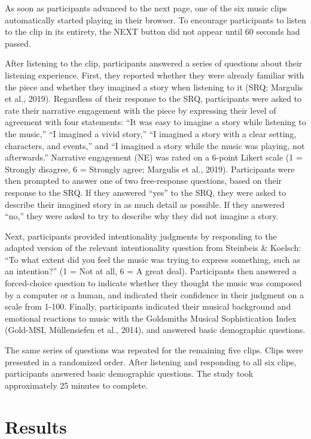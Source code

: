 \documentclass[12pt,twoside]{reedthesis}
\begin{document}
As soon as participants advanced to the next page, one of the six music clips automatically started playing in their browser. To encourage participants to listen to the clip in its entirety, the NEXT button did not appear until 60 seconds had passed. 

After listening to the clip, participants answered a series of questions about their listening experience. First, they reported whether they were already familiar with the piece and whether they imagined a story when listening to it (SRQ; Margulis et al., 2019). Regardless of their response to the SRQ, participants were asked to rate their narrative engagement with the piece by expressing their level of agreement with four statements: “It was easy to imagine a story while listening to the music,” “I imagined a vivid story,” “I imagined a story with a clear setting, characters, and events,” and “I imagined a story while the music was playing, not afterwards.” Narrative engagement (NE) was rated on a 6-point Likert scale (1 = Strongly disagree, 6 = Strongly agree; Margulis et al., 2019). Participants were then prompted to answer one of two free-response questions, based on their response to the SRQ. If they answered “yes” to the SRQ, they were asked to describe their imagined story in as much detail as possible. If they answered “no,” they were asked to try to describe why they did not imagine a story. 

Next, participants provided intentionality judgments by responding to the adapted version of the relevant intentionality question from Steinbeis \& Koelsch: “To what extent did you feel the music was trying to express something, such as an intention?” (1 = Not at all, 6 = A great deal). Participants then answered a forced-choice question to indicate whether they thought the music was composed by a computer or a human, and indicated their confidence in their judgment on a scale from 1-100. Finally, participants indicated their musical background and emotional reactions to music with the Goldsmiths Musical Sophistication Index (Gold-MSI, Müllensiefen et al., 2014), and answered basic demographic questions.

The same series of questions was repeated for the remaining five clips. Clips were presented in a randomized order. After listening and responding to all six clips, participants answered basic demographic questions. The study took approximately 25 minutes to complete. 

\section*{Results}
\end{document}
